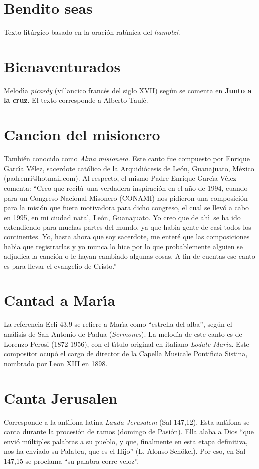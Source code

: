 \documentclass[landscape,12pt]{report}
\begin{document}
\section*{\small Bendito seas} \noindent Texto lit\'urgico basado en la oraci\'on rab\'\i nica del \textit{hamotzi}.
\section*{\small Bienaventurados} \noindent Melod\'\i a \textit{picardy} (villancico franc\'es del siglo XVII) seg\'un se comenta en \textbf{Junto a la cruz}. El texto corresponde a Alberto Taul\'e.
\section*{\small Cancion del misionero} \noindent Tambi\'en conocido como \textit{Alma misionera}. Este canto fue compuesto por Enrique Garc\'\i a V\'elez, sacerdote cat\'olico de la Arquidi\'ocesis de Le\'on, Guanajuato, M\'exico (padrenri@hotmail.com). Al respecto, el mismo Padre Enrique Garc\'\i a V\'elez comenta: ``Creo que recib\'\i\ una verdadera inspiraci\'on en el a\~no de 1994, cuando para un Congreso Nacional Misonero (CONAMI) nos pidieron una composici\'on para la misi\'on que fuera motivadora para dicho congreso, el cual se llev\'o a cabo en 1995, en mi ciudad natal, Le\'on, Guanajuato. Yo creo que de ah\'\i\ se ha ido extendiendo para muchas partes del mundo, ya que hab\'\i a gente de casi todos los continentes. Yo, hasta ahora que soy sacerdote, me enter\'e que las composiciones hab\'\i a que registrarlas y yo munca lo hice por lo que probablemente alguien se adjudica la canci\'on o le hayan cambiado algunas cosas. A fin de cuentas ese canto es para llevar el evangelio de Cristo.''
\section*{\small Cantad a Mar\'\i a} \noindent\footnotesize La referencia Ecli 43,9 se refiere a Mar\'\i a como ``estrella del alba'', seg\'un el an\'alisis de San Antonio de Padua (\textit{Sermones}). La melod\'\i a de este canto es de Lorenzo Perosi (1872-1956), con el t\'\i tulo original en italiano \emph{Lodate Maria}. Este compositor ocup\'o el cargo de director de la Capella Musicale Pontificia Sistina, nombrado por Leon XIII en 1898. 
\section*{\small Canta Jerusalen} \noindent\footnotesize Corresponde a la ant\'\i fona latina \textit{Lauda Jerusalem} (Sal 147,12). Esta ant\'\i fona se canta durante la procesi\'on de ramos (domingo de Pasi\'on). Ella alaba a Dios ``que envi\'o m\'ultiples palabras a su pueblo, y que, finalmente en esta etapa definitiva, nos ha enviado su Palabra, que es el Hijo'' (L. Alonso Sch\"okel). Por eso, en Sal 147,15 se proclama ``su palabra corre veloz''.  
\end{document}
